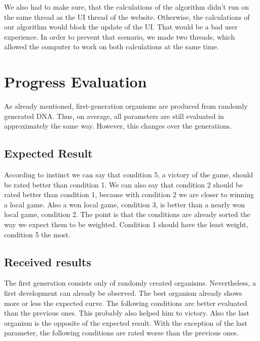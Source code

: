 We also had to make sure, that the calculations of the algorithm didn't run on the same thread as the UI thread of the website. Otherwise, the calculations of our algorithm would block the update of the UI. That would be a bad user experience. In order to prevent that scenario, we made two threads, which allowed the computer to work on both calculations at the same time. 


\section{Progress Evaluation}
As already mentioned, first-generation organisms are produced from randomly generated DNA. Thus, on average, all parameters are still evaluated in approximately the same way. However, this changes over the generations.

\subsection{Expected Result}
According to instinct we can say that condition 5, a victory of the game, should be rated better than condition 1. We can also say that condition 2 should be rated better than condition 1, because with condition 2 we are closer to winning a local game. Also a won local game, condition 3, is better than a nearly won local game, condition 2.
The point is that the conditions are already sorted the way we expect them to be weighted. Condition 1 should have the least weight, condition 5 the most.

\subsection{Received results}
The first generation consists only of randomly created organisms. Nevertheless, a first development can already be observed. The best organism already shows more or less the expected curve. The following conditions are better evaluated than the previous ones. This probably also helped him to victory. Also the last organism is the opposite of the expected result. With the exception of the last parameter, the following conditions are rated worse than the previous ones.\\

